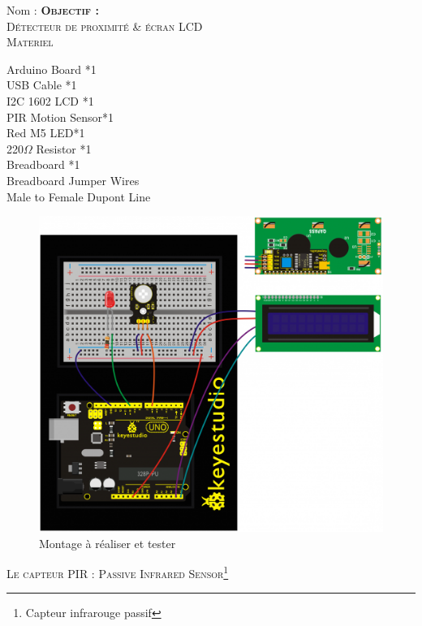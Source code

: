 \documentclass[a4paper, 11pt]{article}           %
\newcommand{\objectif}[1]{\textsc{\huge \textbf{Objectif :}\\[2mm] #1} }
\newcommand{\partie}[1]{\textsc{\Large #1} }
\begin{document}
\sffamily
\hfill Nom : {\noindent\makebox[5cm]{\dotfill}\endgraf}
\objectif{Détecteur de proximité \& écran LCD} \\

\partie{Materiel}                         %
\begin{multicols}{2}
Arduino Board *1 \\
USB Cable *1 \\
I2C 1602 LCD *1 \\
PIR Motion Sensor*1 \\
Red M5 LED*1 \\
220$\Omega$ Resistor *1 \\
Breadboard *1 \\
Breadboard Jumper Wires \\
Male to Female Dupont Line
\end{multicols}
\begin{figure}[!h]
\begin{center}
\includegraphics[width=\textwidth]{keyes_cablage_PIR_LCD_LED}
\caption{Montage à réaliser et tester}
\label{montagePIR}
\end{center}
\end{figure}


\newpage


\partie{Le capteur PIR : Passive Infrared Sensor\footnote{Capteur infrarouge passif}} \\                      %
\end{document}
